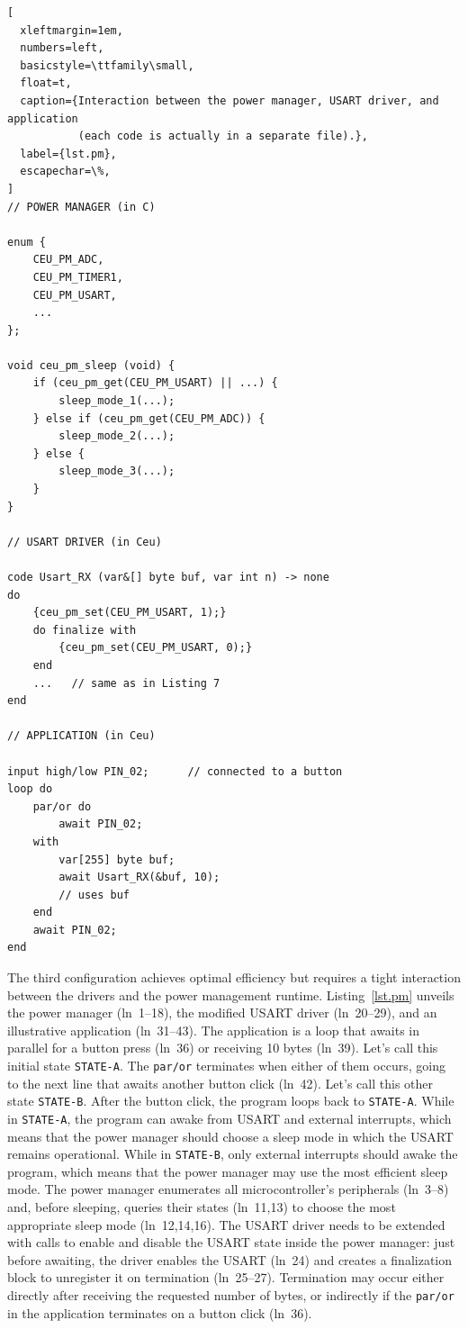 \documentclass[sigplan,10pt,review,anonymous]{acmart}\settopmatter{printfolios=true,printccs=false,printacmref=false}
\newcommand{\code}[1] {{\small{\texttt{#1}}}}
\begin{document}
\begin{lstlisting}[
  xleftmargin=1em,
  numbers=left,
  basicstyle=\ttfamily\small,
  float=t,
  caption={Interaction between the power manager, USART driver, and application
           (each code is actually in a separate file).},
  label={lst.pm},
  escapechar=\%,
]
// POWER MANAGER (in C)

enum {
    CEU_PM_ADC,
    CEU_PM_TIMER1,
    CEU_PM_USART,
    ...
};

void ceu_pm_sleep (void) {
    if (ceu_pm_get(CEU_PM_USART) || ...) {
        sleep_mode_1(...);
    } else if (ceu_pm_get(CEU_PM_ADC)) {
        sleep_mode_2(...);
    } else {
        sleep_mode_3(...);
    }
}

// USART DRIVER (in Ceu)

code Usart_RX (var&[] byte buf, var int n) -> none
do
    {ceu_pm_set(CEU_PM_USART, 1);}
    do finalize with
        {ceu_pm_set(CEU_PM_USART, 0);}
    end
    ...   // same as in Listing 7
end

// APPLICATION (in Ceu)

input high/low PIN_02;      // connected to a button
loop do
    par/or do
        await PIN_02;
    with
        var[255] byte buf;
        await Usart_RX(&buf, 10);
        // uses buf
    end
    await PIN_02;
end
\end{lstlisting}

The third configuration achieves optimal efficiency but requires a tight
interaction between the drivers and the power management runtime.
%
Listing~\ref{lst.pm} unveils the power manager (ln~1--18), the modified USART
driver (ln~20--29), and an illustrative application (ln~31--43).
%
The application is a loop that awaits in parallel for a button press (ln~36) or
receiving 10 bytes (ln~39).
Let's call this initial state \code{STATE-A}.
The \code{par/or} terminates when either of them occurs, going to the next line
that awaits another button click (ln~42).
Let's call this other state \code{STATE-B}.
After the button click, the program loops back to \code{STATE-A}.
%
While in \code{STATE-A}, the program can awake from USART and external
interrupts, which means that the power manager should choose a sleep mode in
which the USART remains operational.
%
While in \code{STATE-B}, only external interrupts should awake the program,
which means that the power manager may use the most efficient sleep mode.
%
The power manager enumerates all microcontroller's peripherals (ln~3--8) and,
before sleeping, queries their states (ln~11,13) to choose the most appropriate
sleep mode (ln~12,14,16).
%
The USART driver needs to be extended with calls to enable and disable the
USART state inside the power manager: just before awaiting, the driver enables
the USART (ln~24) and creates a finalization block to unregister it on
termination (ln~25--27).
Termination may occur either directly after receiving the requested number of
bytes, or indirectly if the \code{par/or} in the application terminates on a
button click (ln~36).
\end{document}
